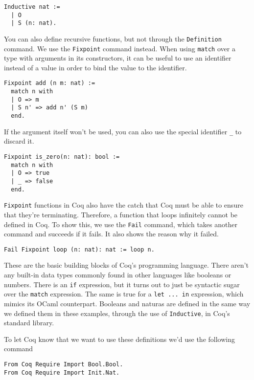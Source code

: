 \begin{verbatim}
Inductive nat :=
  | O 
  | S (n: nat).
\end{verbatim}

You can also define recursive functions, but not through the \texttt{Definition} command. We use
the \texttt{Fixpoint} command instead.  When using \texttt{match} over a type with 
arguments in its constructors, it can be useful to use an identifier instead of a value in order to bind
the value to the identifier.

\begin{verbatim}
Fixpoint add (n m: nat) :=
  match n with
  | O => m
  | S n' => add n' (S m)
  end.
\end{verbatim}

If the argument itself won't be used, you can also use the special
identifier \texttt{_} to discard it.

\begin{verbatim}
Fixpoint is_zero(n: nat): bool :=
  match n with
  | O => true
  | _ => false
  end.
\end{verbatim}


\texttt{Fixpoint} functions in Coq also have the catch that Coq must be able to ensure that
they're terminating. Therefore, a function that loops infinitely cannot be defined in Coq. To show this,
we use the \texttt{Fail} command, which takes another command and succeeds if it fails. It also
shows the reason why it failed.

\begin{verbatim}
Fail Fixpoint loop (n: nat): nat := loop n.
\end{verbatim}

These are the basic building blocks of Coq's programming language. There aren't any built-in data types
commonly found in other languages like booleans or numbers. There is an \texttt{if} expression,
but it turns out to just be syntactic sugar over the \texttt{match} expression. The same is true
for a \texttt{let ... in} expression, which mimics its OCaml counterpart. Booleans and naturas
are defined in the same way we defined them in these examples, through the use of 
\texttt{Inductive}, in Coq's standard library.

To let Coq know that we want to use these definitions we'd use the following command

\begin{verbatim}
From Coq Require Import Bool.Bool.
From Coq Require Import Init.Nat.
\end{verbatim}

